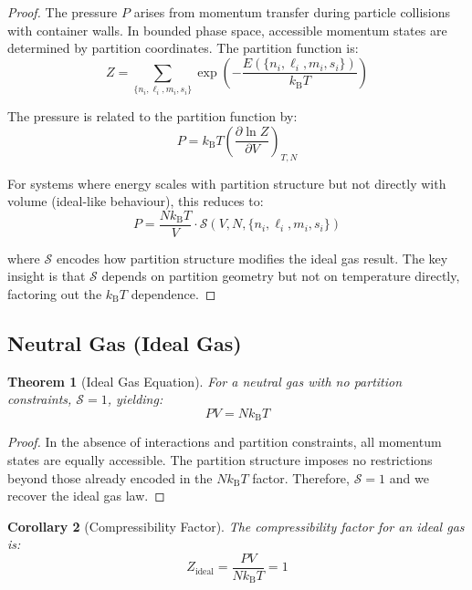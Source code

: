 \documentclass[11pt,twocolumn,a4paper]{article}
\newtheorem{theorem}{Theorem}[section]
\newtheorem{corollary}[theorem]{Corollary}
\theoremstyle{definition}
\theoremstyle{remark}
\newcommand{\kB}{k_{\mathrm{B}}}
\begin{document}
\begin{proof}
The pressure $P$ arises from momentum transfer during particle collisions with container walls. In bounded phase space, accessible momentum states are determined by partition coordinates. The partition function is:
\begin{equation}
Z = \sum_{\{n_i,\ell_i,m_i,s_i\}} \exp\left(-\frac{E(\{n_i,\ell_i,m_i,s_i\})}{\kB T}\right)
\end{equation}

The pressure is related to the partition function by:
\begin{equation}
P = \kB T \left(\frac{\partial \ln Z}{\partial V}\right)_{T,N}
\end{equation}

For systems where energy scales with partition structure but not directly with volume (ideal-like behaviour), this reduces to:
\begin{equation}
P = \frac{N\kB T}{V} \cdot \mathcal{S}(V,N,\{n_i,\ell_i,m_i,s_i\})
\end{equation}

where $\mathcal{S}$ encodes how partition structure modifies the ideal gas result. The key insight is that $\mathcal{S}$ depends on partition geometry but not on temperature directly, factoring out the $\kB T$ dependence.
\end{proof}

\subsection{Neutral Gas (Ideal Gas)}

\begin{theorem}[Ideal Gas Equation]
\label{thm:ideal_gas}
For a neutral gas with no partition constraints, $\mathcal{S} = 1$, yielding:
\begin{equation}
PV = N\kB T
\label{eq:ideal_gas}
\end{equation}
\end{theorem}

\begin{proof}
In the absence of interactions and partition constraints, all momentum states are equally accessible. The partition structure imposes no restrictions beyond those already encoded in the $N\kB T$ factor. Therefore, $\mathcal{S} = 1$ and we recover the ideal gas law.
\end{proof}

\begin{corollary}[Compressibility Factor]
\label{cor:ideal_compressibility}
The compressibility factor for an ideal gas is:
\begin{equation}
Z_{\mathrm{ideal}} = \frac{PV}{N\kB T} = 1
\label{eq:ideal_compressibility}
\end{equation}
\end{corollary}
\end{document}
